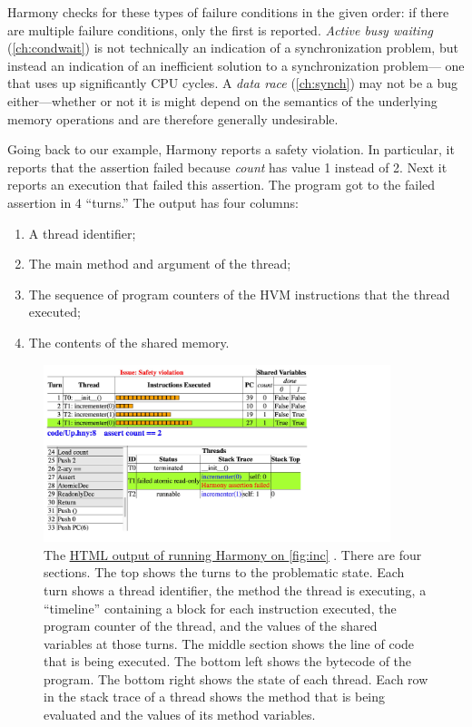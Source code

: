 \documentclass{report}
\newcommand{\harmonyref}[2]{%
\href{https://harmony.cs.cornell.edu/output/#1}{\underline{#2}}%
}
\begin{document}
Harmony checks for these types of failure conditions in the given
order: if there are multiple failure conditions, only the first is
reported.  \emph{Active busy waiting} (\autoref{ch:condwait}) is not
technically an indication of a synchronization problem, but instead an
indication of an inefficient solution to a synchronization problem---
one that uses up significantly CPU cycles.
A \emph{data race} (\autoref{ch:synch}) may not be a bug either---whether or
not it is might depend on the semantics of the underlying memory
operations and are therefore generally undesirable.

Going back to our example, Harmony reports a safety violation.
In particular, it reports that the assertion failed
because \textit{count} has value 1 instead of 2.
Next it reports an execution that failed this assertion.
The program got to the failed assertion in 4 ``turns.''
The output has four columns:
\begin{enumerate}
\item A thread identifier;
\item The main method and argument of the thread;
\item The sequence of program counters of the HVM instructions that the thread executed;
\item The contents of the shared memory.
\end{enumerate}

\begin{figure}
\begin{center}
\includegraphics[width=0.9\textwidth]{figures/Up1.pdf}
\end{center}
\caption{The
\harmonyref{Up.html}{HTML output of running Harmony on \autoref{fig:inc}}.
There are four sections.
The top shows the turns to the problematic state.
Each turn shows a thread identifier, the method the thread is executing,
a ``timeline'' containing a block for each instruction executed, the
program counter of the thread, and the values of the shared variables
at those turns.
The middle section shows the line of code that is being executed.
The bottom left shows the bytecode of the program.
The bottom right shows the state of each thread.
Each row in the stack trace of a thread shows
the method that is being evaluated and
the values of its method variables.}
\label{fig:inchtml1}
\end{figure}
\end{document}
